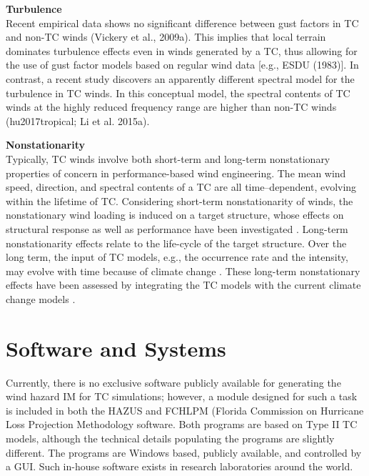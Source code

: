 \noindent\textbf{Turbulence} \\Recent empirical data shows no significant difference between gust factors in TC and non-TC winds (Vickery et al., 2009a). This implies that local terrain dominates turbulence effects even in winds generated by a TC, thus allowing for the use of gust factor models based on regular wind data [e.g., ESDU (1983)]. In contrast, a recent study discovers an apparently different spectral model for the turbulence in TC winds. In this conceptual model, the spectral contents of TC winds at the highly reduced frequency range are higher than non-TC winds (hu2017tropical; Li et al. 2015a).
\newline

\noindent\textbf{Nonstationarity} \\Typically, TC winds involve both short-term and long-term nonstationary properties of concern in performance-based wind engineering. The mean wind speed, direction, and spectral contents of a TC are all time–dependent, evolving within the lifetime of TC. Considering short-term nonstationarity of winds, the nonstationary wind loading is induced on a target structure, whose effects on structural response as well as performance have been investigated \citep{kareem2018generalized, kwon2009gustfront, yau2011hurricane}. Long-term nonstationarity effects relate to the life-cycle of the target structure. Over the long term, the input of TC models, e.g., the occurrence rate and the intensity, may evolve with time because of climate change \citep{emanuel2005increasing}. These long-term nonstationary effects have been assessed by integrating the TC models with the current climate change models \citep{emanuel2008hurricanes,lauren2014assessing,lin2015integrated,liu2014projections}.

\section{Software and Systems}
\label{sec:storm_wind_tools}

Currently, there is no exclusive software publicly available for generating the wind hazard IM for TC simulations; however, a module designed for such a task is included in both the HAZUS \citep{vickery2006hazusmh} and FCHLPM (Florida Commission on Hurricane Loss Projection Methodology \citep{hamid2010predicting, powell2005state} software. Both programs are based on Type II TC models, although the technical details populating the programs are slightly different. The programs are Windows based, publicly available, and controlled by a GUI. Such in-house software exists in research laboratories around the world.

%
